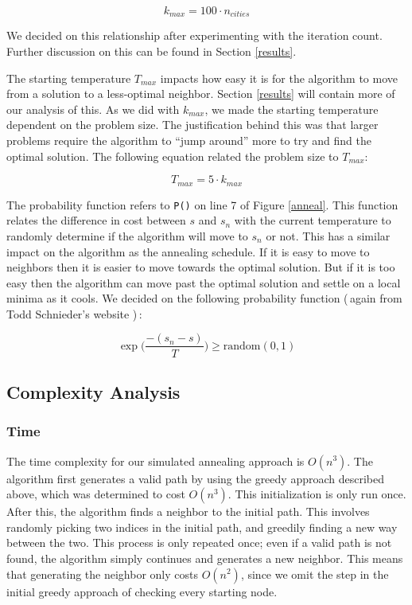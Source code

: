 \documentclass{article}
\def\code#1{\texttt{#1}}
\def\bigO#1{$O(#1)$}
\begin{document}
\begin{multicols}{2}
        \begin{equation}
            k_{max} = 100\cdot n_{cities}
        \end{equation}

        We decided on this relationship after experimenting with the iteration count. Further discussion on this can be found in Section \ref{results}.

        The starting temperature $T_{max}$ impacts how easy it is for the algorithm to move from a solution to a less-optimal neighbor. Section \ref{results} will contain more of our analysis of this. As we did with $k_{max}$, we made the starting temperature dependent on the problem size. The justification behind this was that larger problems require the algorithm to ``jump around'' more to try and find the optimal solution. The following equation related the problem size to $T_{max}$:

        \begin{equation}
            T_{max} = 5\cdot k_{max}
        \end{equation}

        The probability function refers to \code{P()} on line 7 of Figure \ref{anneal}. This function relates the difference in cost between $s$ and $s_n$ with the current temperature to randomly determine if the algorithm will move to $s_n$ or not. This has a similar impact on the algorithm as the annealing schedule. If it is easy to move to neighbors then it is easier to move towards the optimal solution. But if it is too easy then the algorithm can move past the optimal solution and settle on a local minima as it cools. We decided on the following probability function (\,again from Todd Schnieder's website \cite{tspWeb})\,:

        \begin{equation}
            \exp{\Big(\frac{-(s_n - s)}{T}\Big)} \ge \text{random}(0,1)
        \end{equation}

        \subsection{Complexity Analysis}
        \subsubsection{Time}

        The time complexity for our simulated annealing approach is \bigO{n^3}. The algorithm first generates a valid path by using the greedy approach described above, which was determined to cost \bigO{n^3}. This initialization is only run once. After this, the algorithm finds a neighbor to the initial path. This involves randomly picking two indices in the initial path, and greedily finding a new way between the two. This process is only repeated once; even if a valid path is not found, the algorithm simply continues and generates a new neighbor. This means that generating the neighbor only costs \bigO{n^2}, since we omit the step in the initial greedy approach of checking every starting node. 
        

\end{multicols}
\end{document}
